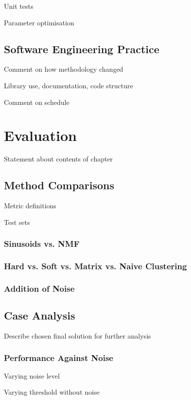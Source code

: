 \documentclass[10pt,twoside,a4paper]{report}
\begin{document}
Unit tests

Parameter optimisation

\section{Software Engineering Practice}

Comment on how methodology changed

Library use, documentation, code structure

Comment on schedule

\chapter{Evaluation}

Statement about contents of chapter

\section{Method Comparisons}

Metric definitions

Test sets

\subsection{Sinusoids vs. NMF}

\subsection{Hard vs. Soft vs. Matrix vs. Naive Clustering}

\subsection{Addition of Noise}

\section{Case Analysis}

Describe chosen final solution for further analysis

\subsection{Performance Against Noise}

Varying noise level

Varying threshold without noise
\end{document}

